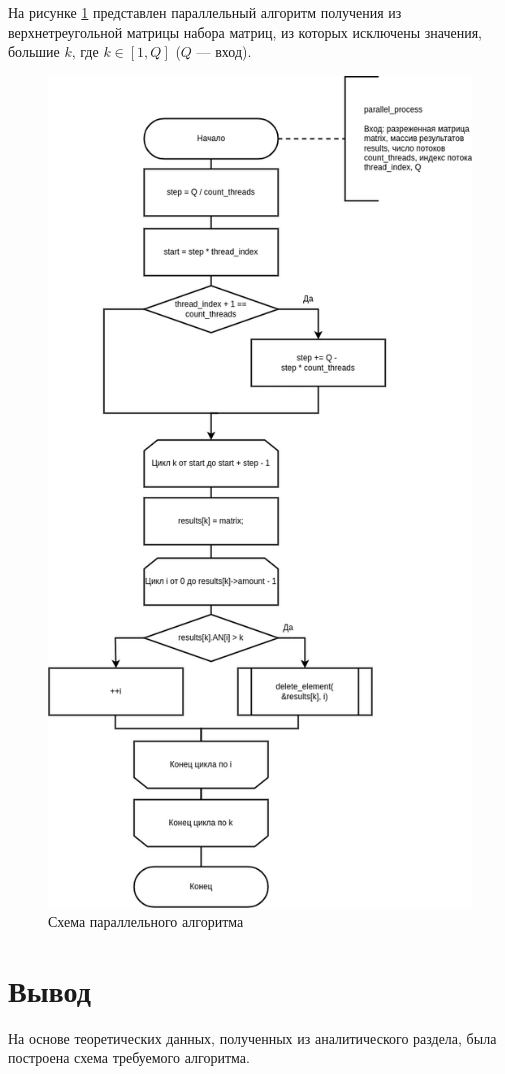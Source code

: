 На рисунке \ref{img:parallel} представлен параллельный алгоритм получения из верхнетреугольной матрицы набора матриц, из которых исключены значения, большие $k$, где $k\in [1,Q]$ ($Q$ --- вход).

\begin{figure}[H]
	\begin{center}
		\includegraphics[scale=0.52]{img/parallel.png}
	\end{center}
	\captionsetup{justification=centering}
	\caption{Схема параллельного алгоритма}
	\label{img:parallel}
\end{figure}

\section*{Вывод}

На основе теоретических данных, полученных из аналитического раздела,
была построена схема требуемого алгоритма.
